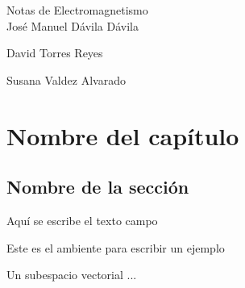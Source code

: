 \documentclass[11pt,fleqn]{book} %
\begin{document}
\begingroup
\thispagestyle{empty}
\centering
\vspace*{9cm}
\par\normalfont\fontsize{35}{35}\sffamily\selectfont
Notas de Electromagnetismo\\%
\vspace*{1cm}
{\Huge Jos\'e Manuel D\'avila D\'avila}\par %
\vspace*{1cm}
{\Huge David Torres Reyes}\par %
\vspace*{1cm}
{\Huge Susana Valdez Alvarado}\par %
\endgroup




\pagestyle{empty} %
\cleardoublepage %




\chapter{Nombre del cap\'itulo}

\section{Nombre de la secci\'on}

Aqu\'i se escribe el texto
campo

\begin{example}
 Este es el ambiente para escribir un ejemplo
\end{example}

\begin{definition}
	Un subespacio vectorial ...
\end{definition}
\end{document}
